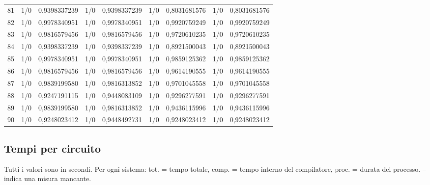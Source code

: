 \begin{longtable}{lrrrrrrrr}
81 & 1/0 & 0,9398337239 & 1/0 & 0,9398337239 & 1/0 & 0,8031681576 & 1/0 & 0,8031681576 \\
82 & 1/0 & 0,9978340951 & 1/0 & 0,9978340951 & 1/0 & 0,9920759249 & 1/0 & 0,9920759249 \\
83 & 1/0 & 0,9816579456 & 1/0 & 0,9816579456 & 1/0 & 0,9720610235 & 1/0 & 0,9720610235 \\
84 & 1/0 & 0,9398337239 & 1/0 & 0,9398337239 & 1/0 & 0,8921500043 & 1/0 & 0,8921500043 \\
85 & 1/0 & 0,9978340951 & 1/0 & 0,9978340951 & 1/0 & 0,9859125362 & 1/0 & 0,9859125362 \\
86 & 1/0 & 0,9816579456 & 1/0 & 0,9816579456 & 1/0 & 0,9614190555 & 1/0 & 0,9614190555 \\
87 & 1/0 & 0,9839199580 & 1/0 & 0,9816313852 & 1/0 & 0,9701045558 & 1/0 & 0,9701045558 \\
88 & 1/0 & 0,9247191115 & 1/0 & 0,9448083109 & 1/0 & 0,9296277591 & 1/0 & 0,9296277591 \\
89 & 1/0 & 0,9839199580 & 1/0 & 0,9816313852 & 1/0 & 0,9436115996 & 1/0 & 0,9436115996 \\
90 & 1/0 & 0,9248023412 & 1/0 & 0,9448492731 & 1/0 & 0,9248023412 & 1/0 & 0,9248023412 \\
\end{longtable}
\endgroup
\clearpage\subsection{Tempi per circuito}
Tutti i valori sono in secondi. Per ogni sistema: tot. = tempo totale, comp. = tempo interno del compilatore, proc. = durata del processo. -- indica una misura mancante.
\begingroup\scriptsize
\setlength{\tabcolsep}{5pt}
